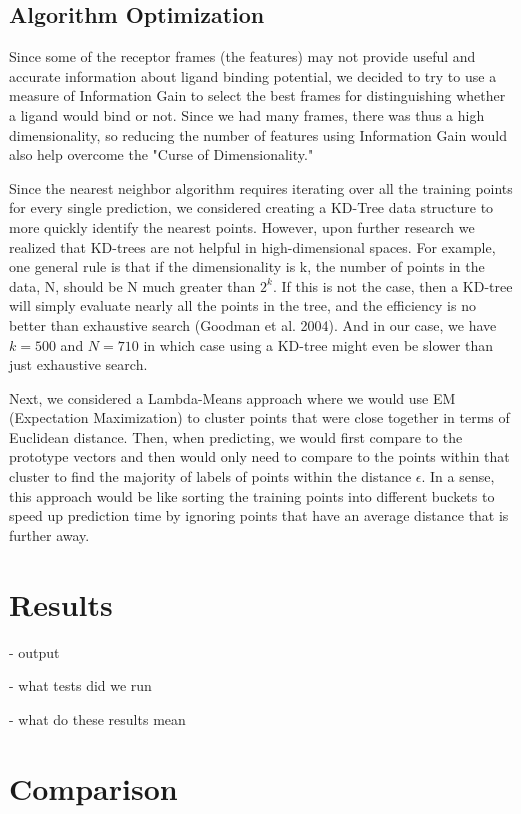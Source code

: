 \documentclass[11pt,letterpaper]{article}
\begin{document}
\subsection{Algorithm Optimization}
Since some of the receptor frames (the features) may not provide useful and accurate information about ligand binding potential, we decided to try to use a measure of Information Gain to select the best frames for distinguishing whether a ligand would bind or not.  Since we had many frames, there was thus a high dimensionality, so reducing the number of features using Information Gain would also help overcome the "Curse of Dimensionality."  

Since the nearest neighbor algorithm requires iterating over all the training points for every single prediction, we considered creating a KD-Tree data structure to more quickly identify the nearest points.  However, upon further research we realized that KD-trees are not helpful in high-dimensional spaces.  For example, one general rule is that if the dimensionality is k, the number of points in the data, N, should be N much greater than $2^k$. If this is not the case, then a KD-tree will simply evaluate nearly all the points in the tree, and the efficiency is no better than exhaustive search (Goodman et al. 2004).  And in our case, we have $k=500$ and $N=710$ in which case using a KD-tree might even be slower than just exhaustive search.

Next, we considered a Lambda-Means approach where we would use EM (Expectation Maximization) to cluster points that were close together in terms of Euclidean distance.  Then, when predicting, we would first compare to the prototype vectors and then would only need to compare to the points within that cluster to find the majority of labels of points within the distance $\epsilon$.  In a sense, this approach would be like sorting the training points into different buckets to speed up prediction time by ignoring points that have an average distance that is further away.


\section{Results}
- output

- what tests did we run

- what do these results mean

\section{Comparison}
\end{document}
